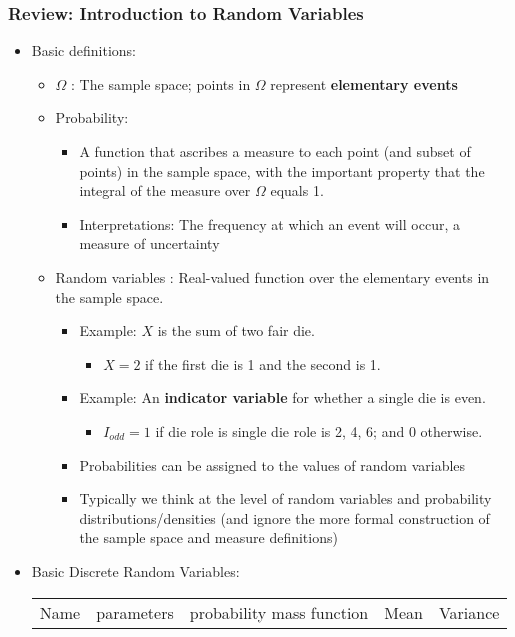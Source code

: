 \documentclass[10pt,containsverbatim,paralist]{article}
\begin{document}
\subsubsection*{Review: Introduction to Random Variables}
\label{sec-1-1-4}
\begin{itemize}
\item Basic definitions:
\label{sec-1-1-4-1}
\begin{itemize}
\item $\Omega$ : The sample space; points in $\Omega$ represent \textbf{elementary events}
\item Probability:
\begin{itemize}
\item A function that ascribes a measure to each point (and subset of points)
in the sample space, with the important property that the integral of the measure over $\Omega$ equals 1.
\item Interpretations: The frequency at which an event will occur, a measure of uncertainty
\end{itemize}
\item Random variables : Real-valued function over the elementary events in the sample space.
\begin{itemize}
\item Example: $X$ is the sum of two fair die.
\begin{itemize}
\item $X=2$ if the first die is 1 and the second is 1.
\end{itemize}
\item Example: An \textbf{indicator variable} for whether a single die is even.
\begin{itemize}
\item $I_{odd}=1$ if die role is single die role is 2, 4, 6; and 0 otherwise.
\end{itemize}
\item Probabilities can be assigned to the values of random variables
\item Typically we think at the level of random variables and probability
distributions/densities (and ignore the more formal construction of the
sample space and measure definitions)
\end{itemize}
\end{itemize}
\item Basic Discrete Random Variables:
\label{sec-1-1-4-2}
\begin{center}
\begin{tabular}{lllll}
\hline
Name & parameters & probability mass function & Mean & Variance\\

\end{tabular}
\end{center}
\end{itemize}
\end{document}
